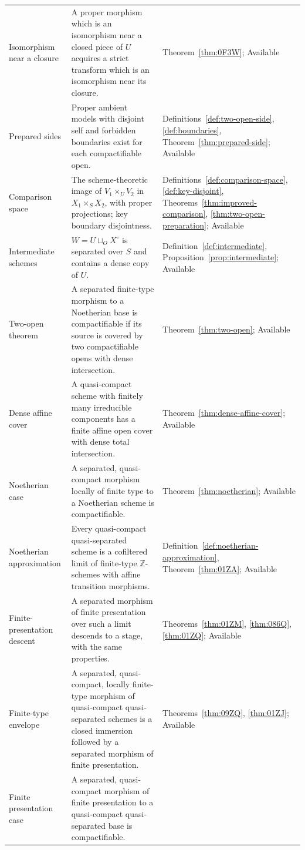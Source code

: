 \documentclass[11pt,a4paper]{article}
\theoremstyle{plain}
\theoremstyle{definition}
\theoremstyle{remark}
\newcommand{\qcqs}{quasi-compact quasi-separated}
\begin{document}
{\begin{longtable}{@{}L{3.05cm}L{8.75cm}L{3.35cm}@{}}
Isomorphism near a closure &
A proper morphism which is an isomorphism near a closed piece of $U$ acquires a strict transform which is an isomorphism near its closure. &
Theorem~\ref{thm:0F3W}; Available\\
Prepared sides &
Proper ambient models with disjoint self and forbidden boundaries exist for each compactifiable open. &
Definitions~\ref{def:two-open-side}, \ref{def:boundaries}, Theorem~\ref{thm:prepared-side}; Available\\
Comparison space &
The scheme-theoretic image of $V_1\times_U V_2$ in $X_1\times_S X_2$, with proper projections; key boundary disjointness. &
Definitions~\ref{def:comparison-space}, \ref{def:key-disjoint}, Theorems~\ref{thm:improved-comparison}, \ref{thm:two-open-preparation}; Available\\
Intermediate schemes &
$W=U\sqcup_O X^{\circ}$ is separated over $S$ and contains a dense copy of $U$. &
Definition~\ref{def:intermediate}, Proposition~\ref{prop:intermediate}; Available\\
Two-open theorem &
A separated finite-type morphism to a Noetherian base is compactifiable if its source is covered by two compactifiable opens with dense intersection. &
Theorem~\ref{thm:two-open}; Available\\
Dense affine cover &
A quasi-compact scheme with finitely many irreducible components has a finite affine open cover with dense total intersection. &
Theorem~\ref{thm:dense-affine-cover}; Available\\
Noetherian case &
A separated, quasi-compact morphism locally of finite type to a Noetherian scheme is compactifiable. &
Theorem~\ref{thm:noetherian}; Available\\
Noetherian approximation &
Every \qcqs{} scheme is a cofiltered limit of finite-type $\mathbb{Z}$-schemes with affine transition morphisms. &
Definition~\ref{def:noetherian-approximation}, Theorem~\ref{thm:01ZA}; Available\\
Finite-presentation descent &
A separated morphism of finite presentation over such a limit descends to a stage, with the same properties. &
Theorems~\ref{thm:01ZM}, \ref{thm:086Q}, \ref{thm:01ZQ}; Available\\
Finite-type envelope &
A separated, quasi-compact, locally finite-type morphism of \qcqs{} schemes is a closed immersion followed by a separated morphism of finite presentation. &
Theorems~\ref{thm:09ZQ}, \ref{thm:01ZJ}; Available\\
Finite presentation case &
A separated, quasi-compact morphism of finite presentation to a \qcqs{} base is compactifiable. &

\end{longtable}}
\end{document}
